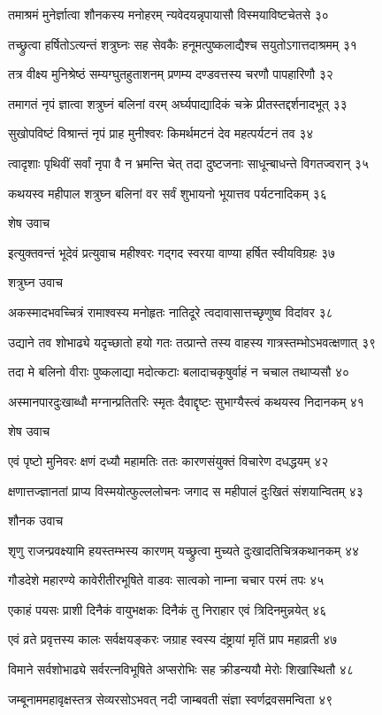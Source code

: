 तमाश्रमं मुनेर्ज्ञात्वा शौनकस्य मनोहरम्
न्यवेदयन्नृपायासौ विस्मयाविष्टचेतसे ३०

तच्छ्रुत्वा हर्षितोऽत्यन्तं शत्रुघ्नः सह सेवकैः
हनूमत्पुष्कलाद्यैश्च सयुतोऽगात्तदाश्रमम् ३१

तत्र वीक्ष्य मुनिश्रेष्ठं सम्यग्घुतहुताशनम्
प्रणम्य दण्डवत्तस्य चरणौ पापहारिणौ ३२

तमागतं नृपं ज्ञात्वा शत्रुघ्नं बलिनां वरम्
अर्घ्यपाद्यादिकं चक्रे प्रीतस्तद्दर्शनादभूत् ३३

सुखोपविष्टं विश्रान्तं नृपं प्राह मुनीश्वरः
किमर्थमटनं देव महत्पर्यटनं तव ३४

त्वादृशाः पृथिवीं सर्वां नृपा वै न भ्रमन्ति चेत्
तदा दुष्टजनाः साधून्बाधन्ते विगतज्वरान् ३५

कथयस्व महीपाल शत्रुघ्न बलिनां वर
सर्वं शुभायनो भूयात्तव पर्यटनादिकम् ३६

शेष उवाच

इत्युक्तवन्तं भूदेवं प्रत्युवाच महीश्वरः
गद्गद स्वरया वाण्या हर्षित स्वीयविग्रहः ३७

शत्रुघ्न उवाच

अकस्मादभवच्चित्रं रामाश्वस्य मनोहृतः
नातिदूरे त्वदावासात्तच्छृणुष्व विदांवर ३८

उद्याने तव शोभाढ्ये यदृच्छातो हयो गतः
तत्प्रान्ते तस्य वाहस्य गात्रस्तम्भोऽभवत्क्षणात् ३९

तदा मे बलिनो वीराः पुष्कलाद्या मदोत्कटाः
बलादाचकृषुर्वाहं न चचाल तथाप्यसौ ४०

अस्मानपारदुःखाब्धौ मग्नान्प्रतितरिः स्मृतः
दैवाद्दृष्टः सुभाग्यैस्त्वं कथयस्व निदानकम् ४१

शेष उवाच

एवं पृष्टो मुनिवरः क्षणं दध्यौ महामतिः
ततः कारणसंयुक्तं विचारेण दधद्धयम् ४२

क्षणात्तज्ज्ञानतां प्राप्य विस्मयोत्फुल्ललोचनः
जगाद स महीपालं दुःखितं संशयान्वितम् ४३

शौनक उवाच

शृणु राजन्प्रवक्ष्यामि हयस्तम्भस्य कारणम्
यच्छ्रुत्वा मुच्यते दुःखादतिचित्रकथानकम् ४४

गौडदेशे महारण्ये कावेरीतीरभूषिते
वाडवः सात्वको नाम्ना चचार परमं तपः ४५

एकाहं पयसः प्राशी दिनैकं वायुभक्षकः
दिनैकं तु निराहार एवं त्रिदिनमुन्नयेत् ४६

एवं व्रते प्रवृत्तस्य कालः सर्वक्षयङ्करः
जग्राह स्वस्य दंष्ट्रायां मृतिं प्राप महाव्रती ४७

विमाने सर्वशोभाढ्ये सर्वरत्नविभूषिते
अप्सरोभिः सह क्रीडन्ययौ मेरोः शिखास्थितौ ४८

जम्बूनाममहावृक्षस्तत्र सेव्यरसोऽभवत्
नदी जाम्बवती संज्ञा स्वर्णद्रवसमन्विता ४९

